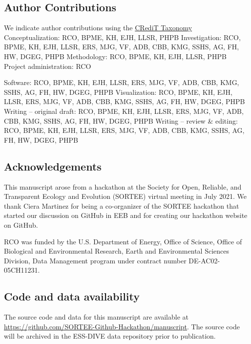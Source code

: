 \hypertarget{author-contributions}{%
\subsection{Author Contributions}\label{author-contributions}}

We indicate author contributions using the \href{https://casrai.org/credit/}{CRediT Taxonomy}
Conceptualization: RCO, BPME, KH, EJH, LLSR, PHPB
Investigation: RCO, BPME, KH, EJH, LLSR, ERS, MJG, VF, ADB, CBB, KMG, SSHS, AG, FH, HW, DGEG, PHPB
Methodology: RCO, BPME, KH, EJH, LLSR, PHPB
Project administration: RCO

Software: RCO, BPME, KH, EJH, LLSR, ERS, MJG, VF, ADB, CBB, KMG, SSHS, AG, FH, HW, DGEG, PHPB
Visualization: RCO, BPME, KH, EJH, LLSR, ERS, MJG, VF, ADB, CBB, KMG, SSHS, AG, FH, HW, DGEG, PHPB
Writing -- original draft: RCO, BPME, KH, EJH, LLSR, ERS, MJG, VF, ADB, CBB, KMG, SSHS, AG, FH, HW, DGEG, PHPB
Writing -- review \& editing: RCO, BPME, KH, EJH, LLSR, ERS, MJG, VF, ADB, CBB, KMG, SSHS, AG, FH, HW, DGEG, PHPB

\hypertarget{acknowledgements}{%
\subsection{Acknowledgements}\label{acknowledgements}}

This manuscript arose from a hackathon at the Society for Open, Reliable, and Transparent Ecology and Evolution (SORTEE) virtual meeting in July 2021. We thank Ciera Martinez for being a co-organizer of the SORTEE hackathon that started our discussion on GitHub in EEB and for creating our hackathon website on GitHub.

RCO was funded by the U.S. Department of Energy, Office of Science, Office of Biological and Environmental Research, Earth and Environmental Sciences Division, Data Management program under contract number DE-AC02-05CH11231.

\hypertarget{code-and-data-availability}{%
\subsection{Code and data availability}\label{code-and-data-availability}}

The source code and data for this manuscript are available at \url{https://github.com/SORTEE-Github-Hackathon/manuscript}. The source code will be archived in the ESS-DIVE data repository prior to publication.

